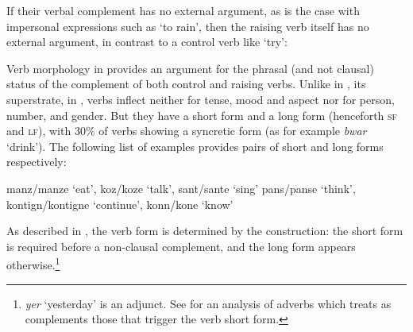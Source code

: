 \eal
{}
\zl
 
If their verbal complement has no external argument, as is the case with impersonal expressions such as  `to rain', then the raising verb itself has no external argument, in contrast to a control verb like  `try':

\eal
{}
\zl

Verb morphology in  provides an argument for the phrasal (and not clausal) status of the complement of both control and raising verbs. Unlike in , its superstrate, in ,  verbs inflect neither for tense, mood and aspect nor for person, number, and
gender. But they have a short form and a long form (henceforth \textsc{sf} and \textsc{lf}), with
30\% of verbs showing a syncretic form (as for example \emph{bwar} `drink'). The following list of examples provides pairs of short and
long forms respectively:

\eal
\ex manz/manze `eat', koz/koze `talk', sant/sante `sing'
\ex pans/panse `think', kontign/kontigne `continue', konn/kone `know'
\zl

As described in \citet[Chapter~4]{Henri2010}, the verb form is determined by the construction: the
short form is required before a non-clausal complement,
  and the long form appears otherwise.\footnote{\textit{yer} `yesterday' is an adjunct. See  for an analysis of  adverbs which treats as complements those that trigger the verb short form.}


